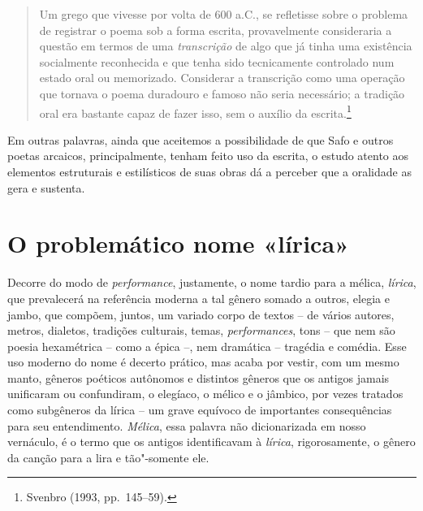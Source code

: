 \begin{quote}
Um grego que vivesse por volta de 600 a.C., se refletisse sobre o problema de
registrar o poema sob a forma escrita, provavelmente consideraria a questão em
termos de uma \textit{transcrição} de algo que já tinha uma existência
socialmente reconhecida e que tenha sido tecnicamente controlado num estado
oral ou memorizado. Considerar a transcrição como uma operação que tornava o
poema duradouro e famoso não seria necessário; a tradição oral era bastante
capaz de fazer isso, sem o auxílio da escrita.\footnote{ Svenbro (1993, pp.~145--59).}
\end{quote}

Em outras palavras, ainda que aceitemos a possibilidade de que Safo e outros
poetas arcaicos, principalmente, tenham feito uso da escrita, o estudo atento
aos elementos estruturais e estilísticos de suas obras dá a perceber que a oralidade as gera e
sustenta.

\section*{O problemático nome «lírica»}

Decorre do modo de \textit{performance}, justamente, o nome tardio para a mélica,
\textit{lírica}, que prevalecerá na referência moderna a tal gênero somado a outros, elegia e jambo, que compõem, juntos, um variado corpo de
textos -- de vários autores, metros, dialetos, tradições culturais, temas,
\textit{performances}, tons -- que nem são poesia hexamétrica -- como a
épica --, nem dramática -- tragédia e comédia. Esse uso moderno do nome é decerto
prático, mas acaba por vestir, com um mesmo manto,
gêneros poéticos autônomos e distintos gêneros que os antigos jamais unificaram ou confundiram, o elegíaco, o mélico e o jâmbico, por vezes tratados como subgêneros da lírica -- um grave equívoco de importantes consequências para seu entendimento. \textit{Mélica}, essa palavra não
dicionarizada em nosso vernáculo, é o termo que os antigos identificavam à
\textit{lírica}, rigorosamente, o gênero da canção para a lira e tão"-somente ele. 

